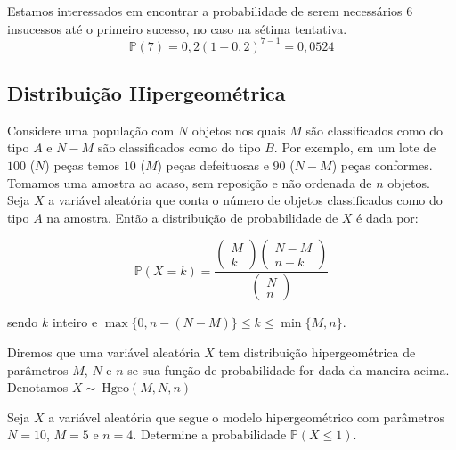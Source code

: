 \documentclass[10pt,a4paper]{article}
\begin{document}
\begin{sol}
	Estamos interessados em encontrar a probabilidade de serem necessários 6 insucessos até o primeiro sucesso, no caso na sétima tentativa.
	\[\mathbb{P}(7) = 0,2(1-0,2)^{7-1} = 0,0524\]
\end{sol}

\subsection{ Distribuição Hipergeométrica}

Considere uma população com $ N $ objetos nos quais $ M $ são classificados como do tipo $ A $ e $ N-M $ são classificados como do tipo $ B $. Por exemplo, em um lote de $ 100 $ ($ N $) peças temos $ 10 $ ($ M $) peças defeituosas e $ 90 $ ($ N-M $) peças conformes. Tomamos uma amostra ao acaso, sem reposição e não ordenada de $ n $ objetos. Seja $ X $ a variável aleatória que conta o número de objetos classificados como do tipo $ A $ na amostra. Então a distribuição de probabilidade de $ X $ é dada por:

\[\mathbb{P}\left(X=k\right)=\frac{\left(\begin{array}{c}M\\k\end{array}\right)\left(\begin{array}{c}N-M\\n-k\end{array}\right)}{\left(\begin{array}{c}N\\n\end{array}\right)}\] 	

sendo $ k $ inteiro e $ \max\{0,n-(N-M)\}\leq k \leq \min\{M,n\} $.

\begin{df}
	Diremos que uma variável aleatória $ X $ tem distribuição hipergeométrica de parâmetros $ M $, $ N $ e $ n $ se sua função de probabilidade for dada da maneira acima. Denotamos $ X \sim \ \text{Hgeo}(M,N,n) $
\end{df}

\begin{eg}
	Seja $ X $ a variável aleatória que segue o modelo hipergeométrico com parâmetros $ N=10 $, $ M=5 $ e $ n=4 $. Determine a probabilidade $ \mathbb{P}(X\leq 1) $.
\end{eg}
\end{document}
